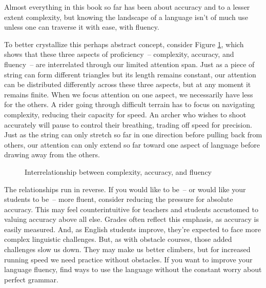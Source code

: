 Almost everything in this book so far has been about accuracy and to a lesser extent complexity, but knowing the landscape of a language isn't of much use unless one can traverse it with ease, with fluency.

To better crystallize this perhaps abstract concept, consider Figure \ref{fig:CAFtriangle}, which shows that these three aspects of proficiency~-- complexity, accuracy, and fluency~-- are interrelated through our limited attention span. Just as a piece of string can form different triangles but its length remains constant, our attention can be distributed differently across these three aspects, but at any moment it remains finite. When we focus attention on one aspect, we necessarily have less for the others. A rider going through difficult terrain has to focus on navigating complexity, reducing their capacity for speed. An archer who wishes to shoot accurately will pause to control their breathing, trading off speed for precision. Just as the string can only stretch so far in one direction before pulling back from others, our attention can only extend so far toward one aspect of language before drawing away from the others.

\begin{figure}[ht]
\centering
{}
\caption{Interrelationship between complexity, accuracy, and fluency}
\label{fig:CAFtriangle}
\end{figure}


The relationships run in reverse. If you would like to be~-- or would like your students to be~-- more fluent, consider reducing the pressure for absolute accuracy. This may feel counterintuitive for teachers and students accustomed to valuing accuracy above all else. Grades often reflect this emphasis, as accuracy is easily measured. And, as English students improve, they're expected to face more complex linguistic challenges. But, as with obstacle courses, those added challenges slow us down. They may make us better climbers, but for increased running speed we need practice without obstacles. If you want to improve your language fluency, find ways to use the language without the constant worry about perfect grammar.

